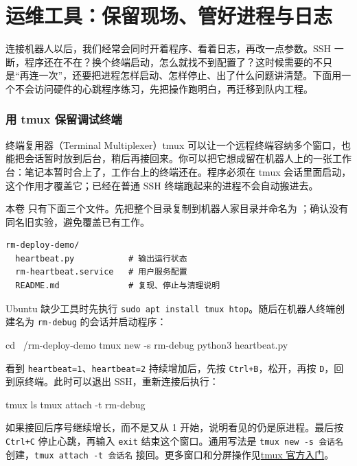 \section{运维工具：保留现场、管好进程与日志}
\label{sec:deploy-ops}

连接机器人以后，我们经常会同时开着程序、看着日志，再改一点参数。SSH 一断，程序还在不在？换个终端启动，怎么就找不到配置了？这时候需要的不只是“再连一次”，还要把进程怎样启动、怎样停止、出了什么问题讲清楚。下面用一个不会访问硬件的心跳程序练习，先把操作跑明白，再迁移到队内工程。

\subsubsection{用 tmux 保留调试终端}

终端复用器（Terminal Multiplexer）tmux 可以让一个远程终端容纳多个窗口，也能把会话暂时放到后台，稍后再接回来。你可以把它想成留在机器人上的一张工作台：笔记本暂时合上了，工作台上的终端还在。程序必须在 tmux 会话里面启动，这个作用才覆盖它；已经在普通 SSH 终端跑起来的进程不会自动搬进去。

\begin{example}[断开以后接回同一个任务]
本卷  只有下面三个文件。先把整个目录复制到机器人家目录并命名为 ；确认没有同名旧实验，避免覆盖已有工作。
\begin{lstlisting}[language={}]
rm-deploy-demo/
  heartbeat.py           # 输出运行状态
  rm-heartbeat.service   # 用户服务配置
  README.md              # 复现、停止与清理说明
\end{lstlisting}
Ubuntu 缺少工具时先执行 \texttt{sudo apt install tmux htop}。随后在机器人终端创建名为 \texttt{rm-debug} 的会话并启动程序：
\begin{tbash}
cd ~/rm-deploy-demo
tmux new -s rm-debug
python3 heartbeat.py
\end{tbash}
看到 \texttt{heartbeat=1}、\texttt{heartbeat=2} 持续增加后，先按 \texttt{Ctrl+B}，松开，再按 \texttt{D}，回到原终端。此时可以退出 SSH，重新连接后执行：
\begin{tbash}
tmux ls
tmux attach -t rm-debug
\end{tbash}
如果接回后序号继续增长，而不是又从 1 开始，说明看见的仍是原进程。最后按 \texttt{Ctrl+C} 停止心跳，再输入 \texttt{exit} 结束这个窗口。通用写法是 \texttt{tmux new -s 会话名} 创建，\texttt{tmux attach -t 会话名} 接回。更多窗口和分屏操作见\href{https://github.com/tmux/tmux/wiki/Getting-Started}{tmux 官方入门}。
\end{example}

